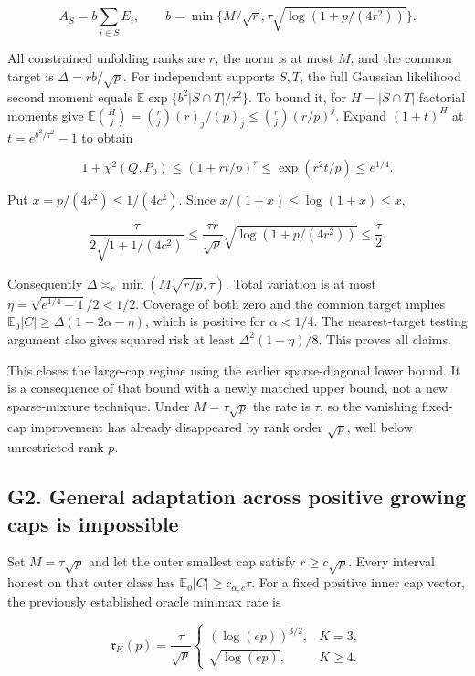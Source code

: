 \[A_S=b\sum_{i\in S}E_i,\qquad
b=\min\{M/\sqrt r,\tau\sqrt{\log(1+p/(4r^2))}\}.\]

All constrained unfolding ranks are \(r\), the norm is at most \(M\),
and the common target is \(\Delta=rb/\sqrt p\). For independent supports
\(S,T\), the full Gaussian likelihood second moment equals
\(\mathbb E\exp\{b^2|S\cap T|/\tau^2\}\). To bound it, for
\(H=|S\cap T|\) factorial moments give
\(\mathbb E\binom Hj=\binom rj(r)_j/(p)_j\le\binom rj(r/p)^j\). Expand
\((1+t)^H\) at \(t=e^{b^2/\tau^2}-1\) to obtain

\[1+\chi^2(Q,P_0)\le(1+rt/p)^r\le\exp(r^2t/p)\le e^{1/4}.\]

Put \(x=p/(4r^2)\le1/(4c^2)\). Since \(x/(1+x)\le\log(1+x)\le x\),

\[\frac{\tau}{2\sqrt{1+1/(4c^2)}}
\le\frac{\tau r}{\sqrt p}\sqrt{\log(1+p/(4r^2))}\le\frac\tau2.\]

Consequently \(\Delta\asymp_c\min(M\sqrt{r/p},\tau)\). Total variation
is at most \(\eta=\sqrt{e^{1/4}-1}/2<1/2\). Coverage of both zero and
the common target implies \(\mathbb E_0|C|\ge\Delta(1-2\alpha-\eta)\),
which is positive for \(\alpha<1/4\). The nearest-target testing
argument also gives squared risk at least \(\Delta^2(1-\eta)/8\). This
proves all claims.

This closes the large-cap regime using the earlier sparse-diagonal lower
bound. It is a consequence of that bound with a newly matched upper
bound, not a new sparse-mixture technique. Under \(M=\tau\sqrt p\) the
rate is \(\tau\), so the vanishing fixed-cap improvement has already
disappeared by rank order \(\sqrt p\), well below unrestricted rank
\(p\).

\subsection{G2. General adaptation across positive growing caps is
impossible}\label{g2.-general-adaptation-across-positive-growing-caps-is-impossible}\label{sup:G2}

Set \(M=\tau\sqrt p\) and let the outer smallest cap satisfy
\(r\ge c\sqrt p\). Every interval honest on that outer class has
\(\mathbb E_0|C|\ge c_{\alpha,c}\tau\). For a fixed positive inner cap
vector, the previously established oracle minimax rate is

\[\mathfrak r_K(p)=\frac\tau{\sqrt p}
\begin{cases}(\log(ep))^{3/2},&K=3,\\
\sqrt{\log(ep)},&K\ge4.
\end{cases}\]

